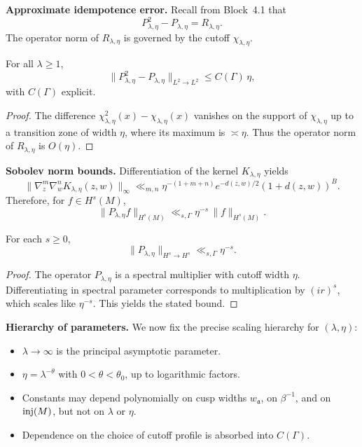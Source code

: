 \medskip

\noindent\textbf{Approximate idempotence error.}
Recall from Block~4.1 that
\[
  P_{\lambda,\eta}^{2} - P_{\lambda,\eta} = R_{\lambda,\eta}.
\]
The operator norm of $R_{\lambda,\eta}$ is governed by the cutoff $\chi_{\lambda,\eta}$.

\begin{lemma}\label{lem:idempotence}
For all $\lambda\geq 1$,
\[
  \|P_{\lambda,\eta}^{2} - P_{\lambda,\eta}\|_{L^{2}\to L^{2}} \leq C(\Gamma)\,\eta,
\]
with $C(\Gamma)$ explicit.
\end{lemma}

\begin{proof}
The difference $\chi_{\lambda,\eta}^{2}(x)-\chi_{\lambda,\eta}(x)$ vanishes on the support of $\chi_{\lambda,\eta}$ up to a transition zone of width $\eta$, where its maximum is $\asymp \eta$.
Thus the operator norm of $R_{\lambda,\eta}$ is $O(\eta)$.
\end{proof}

\medskip

\noindent\textbf{Sobolev norm bounds.}
Differentiation of the kernel $K_{\lambda,\eta}$ yields
\[
  \|\nabla^{m}_{z}\nabla^{n}_{w}K_{\lambda,\eta}(z,w)\|_{\infty} \ll_{m,n} \eta^{-(1+m+n)} e^{-d(z,w)/2}(1+d(z,w))^{B}.
\]
Therefore, for $f\in H^{s}(M)$,
\[
  \|P_{\lambda,\eta}f\|_{H^{s}(M)} \ll_{s,\Gamma} \eta^{-s}\,\|f\|_{H^{s}(M)}.
\]

\begin{lemma}\label{lem:sobolev}
For each $s\geq 0$,
\[
  \|P_{\lambda,\eta}\|_{H^{s}\to H^{s}} \ll_{s,\Gamma} \eta^{-s}.
\]
\end{lemma}

\begin{proof}
The operator $P_{\lambda,\eta}$ is a spectral multiplier with cutoff width $\eta$.
Differentiating in spectral parameter corresponds to multiplication by $(ir)^{s}$, which scales like $\eta^{-s}$.
This yields the stated bound.
\end{proof}

\medskip

\noindent\textbf{Hierarchy of parameters.}
We now fix the precise scaling hierarchy for $(\lambda,\eta)$:
\begin{itemize}
  \item $\lambda\to\infty$ is the principal asymptotic parameter.
  \item $\eta = \lambda^{-\theta}$ with $0<\theta<\theta_{0}$, up to logarithmic factors.
  \item Constants may depend polynomially on cusp widths $w_{\mathfrak{a}}$, on $\beta^{-1}$, and on $\operatorname{inj}(M)$, but not on $\lambda$ or $\eta$.
  \item Dependence on the choice of cutoff profile is absorbed into $C(\Gamma)$.
\end{itemize}

